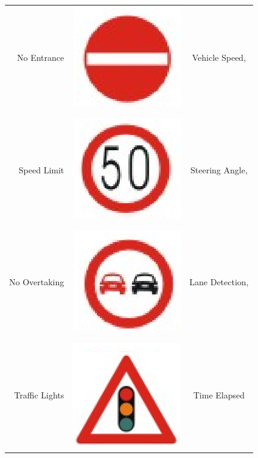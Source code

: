 \documentclass[letterpaper, 10 pt, conference]{ieeeconf}
\begin{document}
\begin{table}[!ht]
{\begin{tabular}{|r|r|c|}
No Entrance & \includegraphics[scale=0.25]{img/noenter} & Vehicle Speed,\\
&&\\
\cline{1-2}
&&\\
Speed Limit & \includegraphics[scale=0.25]{img/speedlimit} & Steering Angle, \\
&&\\
\cline{1-2}
&&\\
No Overtaking & \includegraphics[scale=0.25]{img/overtake} & Lane Detection,\\
&&\\
\cline{1-2}
&&\\
Traffic Lights & \includegraphics[scale=0.25]{img/trafficligt} &  Time Elapsed\\
&&\\

\end{tabular}}
\end{table}
\end{document}
